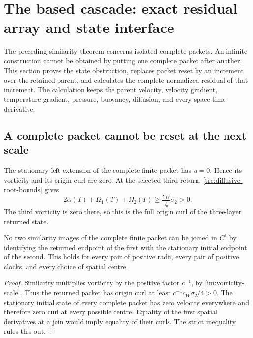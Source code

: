 \section{The based cascade: exact residual array and state interface}
\label{ibc:section}

The preceding similarity theorem concerns isolated complete packets.  An
infinite construction cannot be obtained by putting one complete packet after
another.  This section proves the state obstruction, replaces packet reset by
an increment over the retained parent, and calculates the complete normalized
residual of that increment.  The calculation keeps the parent velocity,
velocity gradient, temperature gradient, pressure, buoyancy, diffusion, and
every space-time derivative.

\subsection{A complete packet cannot be reset at the next scale}

The stationary left extension of the complete finite packet has $u=0$.
Hence its vorticity and its origin curl are zero.  At the selected third
return, \eqref{trc:diffusive-root-bounds} gives
\begin{equation}\label{ibc:positive-output-curl}
 2\dot\alpha(T)+\Omega_1(T)+\Omega_2(T)
 \geq \frac{c_W}{4}\sigma_2>0.
\end{equation}
The third vorticity is zero there, so this is the full origin curl of the
three-layer returned state.

\begin{proposition}\label{ibc:reset-obstruction}
No two similarity images of the complete finite packet can be joined in
$C^1$ by identifying the returned endpoint of the first with the stationary
initial endpoint of the second.  This holds for every pair of positive radii,
every pair of positive clocks, and every choice of spatial centre.
\end{proposition}

\begin{proof}
Similarity multiplies vorticity by the positive factor $c^{-1}$, by
\eqref{im:vorticity-scale}.  Thus the returned packet has origin curl at
least $c^{-1}c_W\sigma_2/4>0$.  The stationary initial state of every
complete packet has zero velocity everywhere and therefore zero curl at
every possible centre.  Equality of the first spatial derivatives at a join
would imply equality of their curls.  The strict inequality rules this out.
\end{proof}

